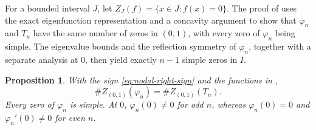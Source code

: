 \documentclass[11pt]{amsart}
\numberwithin{equation}{section}
\newtheorem{proposition}[proposition]{Proposition}
\theoremstyle{remark}
\begin{document}
For a bounded interval $J$, let $Z_J(f)=\{x\in J:f(x)=0\}$. The proof of  uses the exact eigenfunction representation and a concavity argument to show that \(\varphi_n\) and \(T_n\) have the same number of zeros in \((0,1)\), with every zero of \(\varphi_n\) being simple. The eigenvalue bounds and the reflection symmetry of $\varphi_n$, together with a separate analysis at \(0\), then yield exactly \(n-1\) simple zeros in \(I\).
\begin{proposition}\label{prop:nodal-zero-count}
With the sign \eqref{eq:nodal-right-sign} and the functions in
,
\begin{equation}\label{eq:nodal-positive-half-count}
 \#Z_{(0,1)}(\varphi_n)=\#Z_{(0,1)}(T_n).
\end{equation}
Every zero of $\varphi_n$ is simple. At $0$, $\varphi_n(0)\ne0$ for odd $n$,
whereas $\varphi_n(0)=0$ and $\varphi_n'(0)\ne0$ for even $n$.
\end{proposition}
\end{document}
